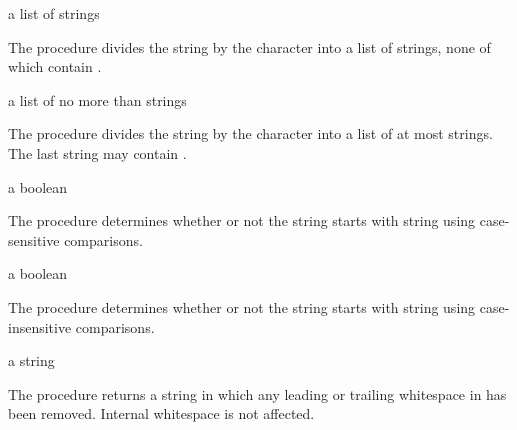 \begin{procedure}
\end{procedure}
\returns{} a list of strings

The  procedure divides the  string by the
 character into a list of strings, none of which
contain .

\begin{procedure}
\end{procedure}
\returns{} a list of no more than  strings

The  procedure divides the  string by the
 character into a list of at most  strings. The
last string may contain .

\begin{procedure}
\end{procedure}
\returns{} a boolean

The  procedure determines whether or not the string
 starts with string  using case-sensitive comparisons.

\begin{procedure}
\end{procedure}
\returns{} a boolean

The  procedure determines whether or not the
string  starts with string  using case-insensitive
comparisons.

\begin{procedure}
\end{procedure}
\returns{} a string

The  procedure returns a string in which
any leading or trailing whitespace in  has been removed.
Internal whitespace is not affected.

